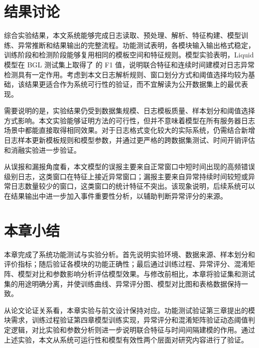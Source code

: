\section{结果讨论}

综合实验结果，本文系统能够完成日志读取、预处理、解析、特征构建、模型训练、异常推断和结果输出的完整流程。功能测试表明，各模块输入输出格式稳定，训练阶段和检测阶段能够复用相同的模板空间和特征规则。模型实验表明，Liquid 模型在 BGL 测试集上取得了  的 F1 值，说明联合特征和连续时间建模对日志异常检测具有一定作用。考虑到本文日志解析规则、窗口划分方式和阈值选择均较为基础，该结果更适合作为系统可行性的验证，而不宜解读为公开数据集上的最优表现。

需要说明的是，实验结果仍受到数据集规模、日志模板质量、样本划分和阈值选择方式影响。本文实验能够证明方法的可行性，但并不意味着模型在所有服务器日志场景中都能直接取得相同效果。对于日志格式变化较大的实际系统，仍需结合新增日志样本更新模板规则和模型参数，并通过更严格的跨数据集测试、时间开销评估和消融实验进一步验证。

从误报和漏报角度看，本文模型的误报主要来自正常窗口中短时间出现的高频错误级别日志，这类窗口在特征上接近异常窗口；漏报主要来自异常持续时间较短或异常日志数量较少的窗口，这类窗口的统计特征不突出。该现象说明，后续系统可以在结果输出中进一步加入事件重要性分析，以辅助判断异常评分的来源。

\section{本章小结}

本章完成了系统功能测试与实验分析。首先说明实验环境、数据来源、样本划分和评价指标；随后验证各模块的功能正确性；最后通过训练过程、异常评分、混淆矩阵、模型对比和参数影响分析评估模型效果。与修改前相比，本章将验证集和测试集的用途明确分离，并使训练曲线、异常评分图、模型对比图和表格数据保持一致。

从论文论证关系看，本章实验与前文设计保持对应。功能测试验证第三章提出的模块需求，训练过程验证第四章模型训练实现，异常评分和混淆矩阵验证动态阈值判定逻辑，对比实验和参数分析则进一步说明联合特征与时间间隔建模的作用。通过上述实验，本文从系统可运行性和模型有效性两个层面对研究内容进行了验证。
